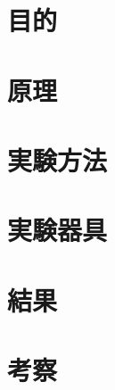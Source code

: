 \documentclass[12pt]{jarticle}
\begin{document}
\title{}
\author{高浜 陸生}
\maketitle
\newpage
\section{目的}

\section{原理}

\section{実験方法}

\section{実験器具}

\section{結果}

\section{考察}
\end{document}
